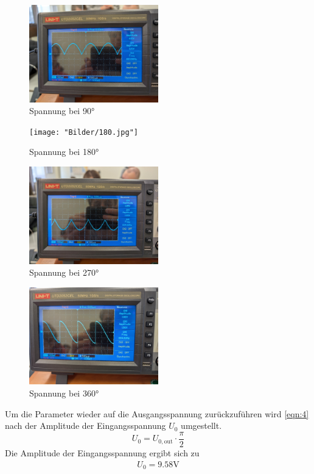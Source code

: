 \begin{figure}
    \caption{Spannung bei 90$\unit{\degree}$}
    \label{fig:12}
    \centering
    \includegraphics[width=0.5\textwidth]{"Bilder/90.jpg"}
\end{figure}
\begin{figure}
    \caption{Spannung bei 180$\unit{\degree}$}
    \label{fig:12}
    \centering
    \texttt{[image: "Bilder/180.jpg"]}
\end{figure}
\begin{figure}
    \caption{Spannung bei 270$\unit{\degree}$}
    \label{fig:12}
    \centering
    \includegraphics[width=0.5\textwidth]{"Bilder/270.jpg"}
\end{figure}
\begin{figure}
    \caption{Spannung bei 360$\unit{\degree}$}
    \label{fig:12}
    \centering
    \includegraphics[width=0.5\textwidth]{"Bilder/360.jpg"}
\end{figure}

\noindent Um die Parameter wieder auf die Ausgangsspannung zurückzuführen wird 
\autoref{eqn:4} nach der Amplitude der Eingangsspannung $U_0$ umgestellt.
\begin{equation}
    U_0 = U_{0,\text{out}} \cdot \frac{\pi}{2} 
\end{equation}
Die Amplitude der Eingangsspannung ergibt sich zu 
\begin{align*}
    U_0 = 9.58 \unit{\volt}
\end{align*}



